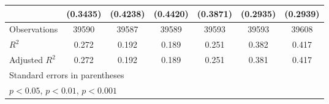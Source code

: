 {\begin{tabular}{l*{6}{c}}
                    &    (0.3435)         &    (0.4238)         &    (0.4420)         &    (0.3871)         &    (0.2935)         &    (0.2939)         \\
\midrule
Observations        &       39590         &       39587         &       39589         &       39593         &       39593         &       39608         \\
\(R^{2}\)           &       0.272         &       0.192         &       0.189         &       0.251         &       0.382         &       0.417         \\
Adjusted \(R^{2}\)  &       0.272         &       0.192         &       0.189         &       0.251         &       0.381         &       0.417         \\
\bottomrule
\multicolumn{7}{l}{\footnotesize Standard errors in parentheses}\\
\multicolumn{7}{l}{\footnotesize \sym{*} \(p<0.05\), \sym{**} \(p<0.01\), \sym{***} \(p<0.001\)}\\
\end{tabular}
}
